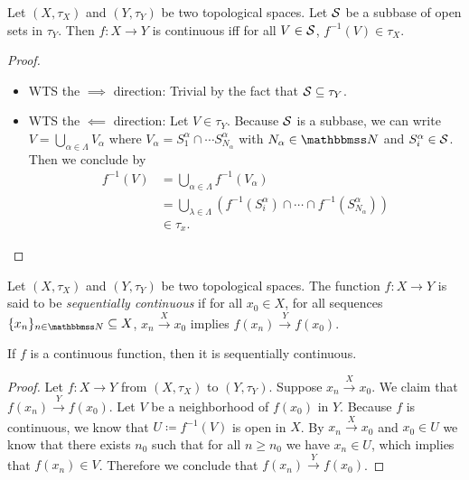 \documentclass[screen,single]{techreport}
\numberwithin{equation}{section}
\begin{document}
\begin{proposition}\label{Prop:ContFuncIffOnSubbase}
	Let $(X,\tau_X)$ and $(Y,\tau_Y)$ be two topological spaces.
	Let $\mathcal{S}$ be a subbase of open sets in $\tau_Y$.
	Then $f : X \to Y$ is continuous iff for all $V \in \mathcal{S}$, $f^{-1}(V) \in \tau_X$.
\end{proposition}
\begin{proof}\
	\begin{itemize}
	  \item WTS the $\implies$ direction: Trivial by the fact that $\mathcal{S} \subseteq \tau_Y$.
	  \item WTS the $\impliedby$ direction: Let $V \in \tau_Y$.
	  Because $\mathcal{S}$ is a subbase, we can write $V = \bigcup_{\alpha \in \Lambda} V_\alpha$ where $V_\alpha = S_1^\alpha \cap \cdots S_{N_\alpha}^\alpha$ with $N_\alpha \in \bbN$ and $S^\alpha_i \in \mathcal{S}$.
	  Then we conclude by
	  \begin{align*}
	    f^{-1}(V) & = \bigcup_{\alpha\in\Lambda} f^{-1}(V_\alpha) \\
	    & = \bigcup_{\lambda \in \Lambda} (f^{-1}(S^\alpha_i) \cap \cdots \cap f^{-1}(S_{N_\alpha}^\alpha)) \\
	    & \in \tau_x.
	  \end{align*}
	\end{itemize}
\end{proof}

\begin{definition}\label{De:SequentiallyContinuous}
	Let $(X,\tau_X)$ and $(Y,\tau_Y)$ be two topological spaces.
	The function $f : X \to Y$ is said to be \emph{sequentially continuous} if for all $x_0 \in X$, for all sequences $\{x_n\}_{n \in \bbN} \subseteq X$, $x_n \xrightarrow{X} x_0$ implies $f(x_n) \xrightarrow{Y} f(x_0)$.
\end{definition}

\begin{proposition}\label{Prop:ContImplySeqCont}
	If $f$ is a continuous function, then it is sequentially continuous.
\end{proposition}
\begin{proof}
	Let $f : X \to Y$ from $(X,\tau_X)$ to $(Y,\tau_Y)$.
	Suppose $x_n \xrightarrow{X} x_0$.
	We claim that $f(x_n) \xrightarrow{Y} f(x_0)$.
	Let $V$ be a neighborhood of $f(x_0)$ in $Y$.
	Because $f$ is continuous, we know that $U \coloneqq f^{-1}(V)$ is open in $X$.
	By $x_n \xrightarrow{X} x_0$ and $x_0 \in U$ we know that there exists $n_0$ such that for all $n \ge n_0$ we have $x_n \in U$, which implies that $f(x_n) \in V$.
	Therefore we conclude that $f(x_n) \xrightarrow{Y} f(x_0)$.
\end{proof}
\end{document}

